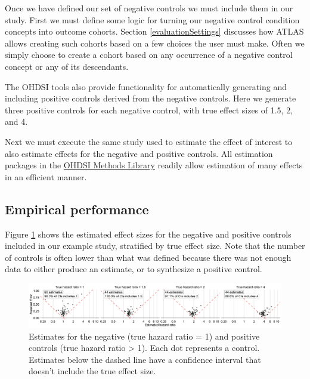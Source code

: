 \documentclass[]{book}
\begin{document}
Once we have defined our set of negative controls we must include them
in our study. First we must define some logic for turning our negative
control condition concepts into outcome cohorts. Section
\ref{evaluationSettings} discusses how ATLAS allows creating such
cohorts based on a few choices the user must make. Often we simply
choose to create a cohort based on any occurrence of a negative control
concept or any of its descendants.

The OHDSI tools also provide functionality for automatically generating
and including positive controls derived from the negative controls. Here
we generate three positive controls for each negative control, with true
effect sizes of 1.5, 2, and 4.

Next we must execute the same study used to estimate the effect of
interest to also estimate effects for the negative and positive
controls. All estimation packages in the
\href{https://ohdsi.github.io/MethodsLibrary/}{OHDSI Methods Library}
readily allow estimation of many effects in an efficient manner.

\subsection{Empirical performance}\label{empirical-performance}

Figure \ref{fig:controls} shows the estimated effect sizes for the
negative and positive controls included in our example study, stratified
by true effect size. Note that the number of controls is often lower
than what was defined because there was not enough data to either
produce an estimate, or to synthesize a positive control.

\begin{figure}

{\centering \includegraphics[width=1\linewidth]{images/MethodValidity/controls} 

}

\caption{Estimates for the negative (true hazard ratio = 1) and positive controls (true hazard ratio > 1). Each dot represents a control. Estimates below the dashed line have a confidence interval that doesn't include the true effect size.}\label{fig:controls}
\end{figure}
\end{document}
